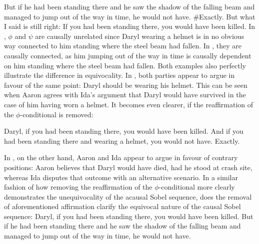 			\a	{}But if he had been standing there and he saw the shadow of the falling beam and managed to jump out of the way in time, he would not have.
			\a	{}\#Exactly. But what I said is still right:  If you had been
standing there, you would have been killed.\hfill\parencite[adapted from][p. 153f]{Klecha2014}
\xe
In , $\phi$ and $\psi$ are causally unrelated since Daryl wearing a helmet is in no obvious way connected to him standing where the steel beam had fallen. In , they are causally connected, as him jumping out of the way in time is causally dependent on him standing where the steel beam had fallen. Both examples also perfectly illustrate the difference in equivocality. In , both parties appear to argue in favour of the same point: Daryl should be wearing his helmet. This can be seen when Aaron agrees with Ida's argument that Daryl would have survived in the case of him having worn a helmet. It becomes even clearer, if the reaffirmation of the $\phi$-conditional is removed:\\\begin{minipage}{\linewidth}
\pex{}
			\a	{}Daryl, if you had been standing there, you would have been killed.
			\a	{}And if you had been standing there and wearing a helmet, you would not have.
			\a	{}Exactly.\hfill\parencite[p. 150]{Klecha2015}
\xe\end{minipage}
In , on the other hand, Aaron and Ida appear to argue in favour of contrary positions: Aaron believes that Daryl would have died, had he stood at crash site, whereas Ida disputes that outcome with an alternative scenario. In a similar fashion of how removing the reaffirmation of the $\phi$-conditional more clearly demonstrates the unequivocality of the acausal Sobel sequence, does the removal of aforementioned affirmation clarify the equivocal nature of the causal Sobel sequence:
\pex{}
			\a	{}Daryl, if you had been standing there, you would have been killed.
			\a	{}But if he had been standing there and he saw the shadow of the falling beam and managed to jump out of the way in time, he would not have.
